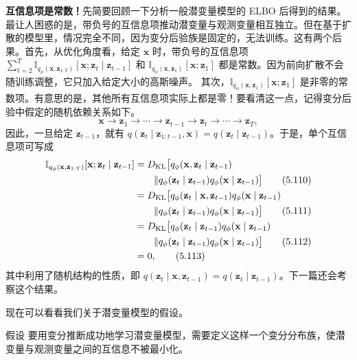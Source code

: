 \textbf{互信息项是常数！}\quad 先简要回顾一下分析一般潜变量模型的 ELBO 后得到的结果。最让人困惑的是，带负号的互信息项推动潜变量与观测变量相互独立。但在基于扩散的模型里，情况完全不同，因为变分后验族是固定的，无法训练。这有两个后果。首先，从优化角度看，给定 $\mathbf{x}$ 时，带负号的互信息项 $\sum_{t=2}^T\mathbb{I}_{q_\phi(\mathbf{x},\mathbf{z}_{1:T})}[\mathbf{x};\mathbf{z}_t\mid\mathbf{z}_{t-1}]$ 和 $\mathbb{I}_{q_\phi(\mathbf{x},\mathbf{z}_1)}[\mathbf{x};\mathbf{z}_1]$ 都是常数。因为前向扩散不会随训练调整，它只加入给定大小的高斯噪声。
其次，$\mathbb{I}_{q_\phi(\mathbf{x},\mathbf{z}_1)}[\mathbf{x};\mathbf{z}_1]$ 是非零的常数项。有意思的是，其他所有互信息项实际上都是零！要看清这一点，记得变分后验中假定的随机依赖关系如下。
\begin{equation}
\mathbf{x}\to\mathbf{z}_1\to\cdots\to\mathbf{z}_{t-1}\to\mathbf{z}_t\to\cdots\to\mathbf{z}_T,
\tag{5.109}\label{eq:05-109}
\end{equation}
因此，一旦给定 $\mathbf{z}_{t-1}$，就有 $q(\mathbf{z}_t\mid\mathbf{z}_{1:t-1},\mathbf{x})=q(\mathbf{z}_t\mid\mathbf{z}_{t-1})$。于是，单个互信息项可写成
\begin{align}
\mathbb{I}_{q_\phi(\mathbf{x},\mathbf{z}_{1:T})}[\mathbf{x};\mathbf{z}_t\mid\mathbf{z}_{t-1}]
 &=D_{\mathrm{KL}}\bigl[q_\phi(\mathbf{x},\mathbf{z}_t\mid\mathbf{z}_{t-1})\notag\\
 &\qquad\|q_\phi(\mathbf{z}_t\mid\mathbf{z}_{t-1})q_\phi(\mathbf{x}\mid\mathbf{z}_{t-1})\bigr] \tag{5.110}\label{eq:05-110}\\
 &=D_{\mathrm{KL}}\bigl[q_\phi(\mathbf{z}_t\mid\mathbf{x},\mathbf{z}_{t-1})q_\phi(\mathbf{x}\mid\mathbf{z}_{t-1})\notag\\
 &\qquad\|q_\phi(\mathbf{z}_t\mid\mathbf{z}_{t-1})q_\phi(\mathbf{x}\mid\mathbf{z}_{t-1})\bigr] \tag{5.111}\label{eq:05-111}\\
 &=D_{\mathrm{KL}}\bigl[q_\phi(\mathbf{z}_t\mid\mathbf{z}_{t-1})q_\phi(\mathbf{x}\mid\mathbf{z}_{t-1})\notag\\
 &\qquad\|q_\phi(\mathbf{z}_t\mid\mathbf{z}_{t-1})q_\phi(\mathbf{x}\mid\mathbf{z}_{t-1})\bigr] \tag{5.112}\label{eq:05-112}\\
 &=0, \tag{5.113}\label{eq:05-113}
\end{align}
其中利用了随机结构的性质，即 $q(\mathbf{z}_t\mid\mathbf{x},\mathbf{z}_{t-1})=q(\mathbf{z}_t\mid\mathbf{z}_{t-1})$。下一篇还会考察这个结果。

现在可以看看我们关于潜变量模型的假设。
\begin{booknote}{假设}
要用变分推断成功地学习潜变量模型，需要定义这样一个变分分布族，使潜变量与观测变量之间的互信息不被最小化。
\end{booknote}

